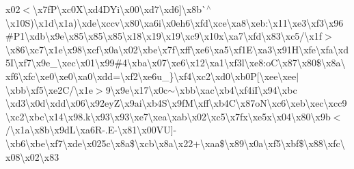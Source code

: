 \begin{DoxyCompactItemize}
{}x02$<$\textbackslash{}x7f\+P\textbackslash{}xc0\+X\textbackslash{}xd4\+D\+Yi\textbackslash{}x00\textbackslash{}xd7\textbackslash{}xd6\mbox{]}\textbackslash{}x8b\`{}$^\wedge$\textbackslash{}x10\+S)\textbackslash{}x1d\textbackslash{}x1a)\textbackslash{}xde\textbackslash{}xccv\textbackslash{}x80\textbackslash{}xa6i\textbackslash{}x0eh6\textbackslash{}xfd\textbackslash{}xce\textbackslash{}xa8\textbackslash{}xeb\+:\textbackslash{}x11\textbackslash{}xe3\textbackslash{}xf3\textbackslash{}x96\#\+P1\textbackslash{}xdb\textbackslash{}x9e\textbackslash{}x85\textbackslash{}x85\textbackslash{}x85\textbackslash{}x18\textbackslash{}x19\textbackslash{}x19\textbackslash{}xc9\textbackslash{}x10x\textbackslash{}xa7\textbackslash{}xfd\textbackslash{}x83\textbackslash{}xc5/\textbackslash{}x1f$>$\textbackslash{}x86\textbackslash{}xc7\textbackslash{}x1e\textbackslash{}x98\textbackslash{}xcf\textbackslash{}x0a\textbackslash{}x02\textbackslash{}xbe\textbackslash{}x7f\textbackslash{}xff\textbackslash{}xe6\textbackslash{}xa5\textbackslash{}xf1\+E\textbackslash{}xa3\textbackslash{}x91\+H\textbackslash{}xfe\textquotesingle{}\textbackslash{}xfa\textbackslash{}xd5\+I\textbackslash{}xf7\textbackslash{}x9e\+\_\+\textbackslash{}xec\textbackslash{}x01\textbackslash{}x99\#4\textbackslash{}xba\textbackslash{}x07\textbackslash{}xe6\textbackslash{}x12\textbackslash{}xa1\textbackslash{}xf3l\textbackslash{}xe8\+:o\+C\textbackslash{}x87\textbackslash{}x80\$\textbackslash{}x8a\textbackslash{}xf6\textbackslash{}xfc\textbackslash{}xe0\textbackslash{}xe0\textbackslash{}xa0\textbackslash{}xdd=\textbackslash{}xf2\textbackslash{}xe6u\+\_\+\}\textbackslash{}xf4\textbackslash{}xc2\textbackslash{}xd0\textbackslash{}xb0\+P\mbox{[}\textbackslash{}xee\textbackslash{}xee$\vert$\textbackslash{}xbb\textbackslash{}xf5\textbackslash{}xe2\+C/\textbackslash{}x1e$>$9\textbackslash{}x9e\textbackslash{}x17\textbackslash{}x0c$\sim$\textbackslash{}xbb\textbackslash{}xac\textbackslash{}xb4\textbackslash{}xf4i\+I\textbackslash{}x94\textbackslash{}xbc \textbackslash{}xd3\textbackslash{}x0d\textbackslash{}xdd\textbackslash{}x06\textbackslash{}x92ey\+Z\textbackslash{}x9ai\textbackslash{}xb4\+S\textbackslash{}x9f\+M\textbackslash{}xff\textbackslash{}xb4\+C\textbackslash{}x87o\+N\textbackslash{}xc6\textbackslash{}xeb\textbackslash{}xec\textbackslash{}xcc9\textbackslash{}xc2\textbackslash{}xbc\textbackslash{}x14\textbackslash{}x98.\+k\textbackslash{}x93\textbackslash{}x93\textbackslash{}xe7\textbackslash{}xea\textbackslash{}xab\textbackslash{}x02\textbackslash{}xc5\textbackslash{}x7fx\textbackslash{}xe5x\textbackslash{}x04\textbackslash{}x80\textbackslash{}x9b$<$/\textbackslash{}x1a\textbackslash{}x8b\textbackslash{}x9d\+L\textbackslash{}xa6\+R-\/.\+E-\/\textbackslash{}x81\textbackslash{}x00\+V\+U\mbox{]}-\/\textbackslash{}xb6\textbackslash{}xbe\textbackslash{}xf7\textbackslash{}xde\textbackslash{}x025c\textbackslash{}x8a\$\textbackslash{}xcb\textbackslash{}x8a\textbackslash{}x22+\textbackslash{}xaa\$\textbackslash{}x89\textbackslash{}x0a\textbackslash{}xf5\textbackslash{}xbf\$\textbackslash{}x88\textbackslash{}xfc\textbackslash{}x08\textbackslash{}x02\textbackslash{}x83 
\end{DoxyCompactItemize}
